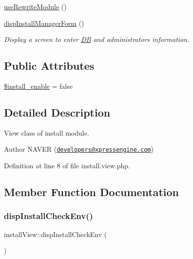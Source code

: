 \begin{DoxyCompactItemize}
\hyperlink{classinstallView_a276997dd4c77a1a1cec5ceed56367ee9}{use\+Rewrite\+Module} ()
\item 
\hyperlink{classinstallView_a00758f2134453587a409e8e8f3e4fada}{disp\+Install\+Manager\+Form} ()
\begin{DoxyCompactList}\small\item\em Display a screen to enter \hyperlink{classDB}{DB} and administrator\textquotesingle{}s information. \end{DoxyCompactList}\end{DoxyCompactItemize}
\subsection*{Public Attributes}
\begin{DoxyCompactItemize}
\item 
\hyperlink{classinstallView_af8e64ea4a91e88a6539bef37e73d3a05}{\$install\+\_\+enable} = false
\end{DoxyCompactItemize}


\subsection{Detailed Description}
View class of install module. 

\begin{DoxyAuthor}{Author}
N\+A\+V\+ER (\href{mailto:developers@xpressengine.com}{\tt developers@xpressengine.\+com}) 
\end{DoxyAuthor}


Definition at line 8 of file install.\+view.\+php.



\subsection{Member Function Documentation}
\hypertarget{classinstallView_ac73107933a9a9498aaef04380137794d}{}\label{classinstallView_ac73107933a9a9498aaef04380137794d} 
\subsubsection{\texorpdfstring{disp\+Install\+Check\+Env()}{dispInstallCheckEnv()}}
{\footnotesize\ttfamily install\+View\+::disp\+Install\+Check\+Env (\begin{DoxyParamCaption}{ }\end{DoxyParamCaption})}



